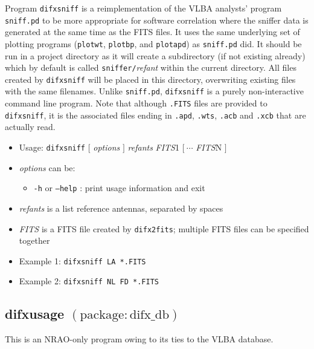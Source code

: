 Program {\tt difxsniff} is a reimplementation of the VLBA analysts' program {\tt sniff.pd} to be more appropriate for software correlation where the sniffer data is generated at the same time as the FITS files.
It uses the same underlying set of plotting programs ({\tt plotwt}, {\tt plotbp}, and {\tt plotapd}) as {\tt sniff.pd} did.
It should be run in a project directory as it will create a subdirectory (if not existing already) which by default is called {\tt sniffer/}{\em refant} within the current directory.
All files created by {\tt difxsniff} will be placed in this directory, overwriting existing files with the same filenames.
Unlike {\tt sniff.pd}, {\tt difxsniff} is a purely non-interactive command line program.
Note that although {\tt .FITS} files are provided to {\tt difxsniff}, it is the associated files ending in {\tt .apd}, {\tt .wts}, {\tt .acb} and {\tt .xcb} that are actually read.

\begin{itemize}
\item[] Usage: {\tt difxsniff} $[$ {\em options} $]$ {\em refants} {\em FITS}1 $[\ \cdots$ {\em FITS}N $]$
\item[] {\em options} can be:
\begin{itemize}
\item[] {\tt -h} or {\tt --help} : print usage information and exit
\end{itemize}
\item[] {\em refants} is a list reference antennas, separated by spaces
\item[] {\em FITS} is a FITS file created by {\tt difx2fits}; multiple FITS files can be specified together
\item[] Example 1: {\tt difxsniff LA *.FITS}
\item[] Example 2: {\tt difxsniff NL FD *.FITS}
\end{itemize}








\subsection{difxusage {\small $\mathrm{(package: difx\_db)}$}} \label{sec:difxusage}

This is an NRAO-only program owing to its ties to the VLBA database.

